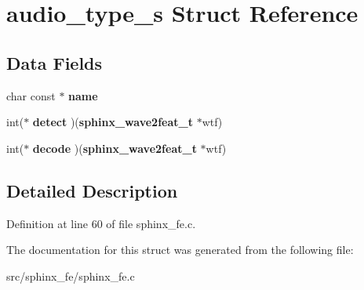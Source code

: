\section{audio\+\_\+type\+\_\+s Struct Reference}
\label{structaudio__type__s}
\subsection*{Data Fields}
\begin{DoxyCompactItemize}
\item 
char const $\ast$ {\bfseries name}\label{structaudio__type__s_a5fa19a5507e0c89c1f3113813ffd6442}

\item 
int($\ast$ {\bfseries detect} )({\bf sphinx\+\_\+wave2feat\+\_\+t} $\ast$wtf)\label{structaudio__type__s_a02d2a7d109e63a8447a81fcb1e502ba0}

\item 
int($\ast$ {\bfseries decode} )({\bf sphinx\+\_\+wave2feat\+\_\+t} $\ast$wtf)\label{structaudio__type__s_ab99854b93f63f4e97d3fc59e1d1bae2d}

\end{DoxyCompactItemize}


\subsection{Detailed Description}


Definition at line 60 of file sphinx\+\_\+fe.\+c.



The documentation for this struct was generated from the following file\+:\begin{DoxyCompactItemize}
\item 
src/sphinx\+\_\+fe/sphinx\+\_\+fe.\+c\end{DoxyCompactItemize}
